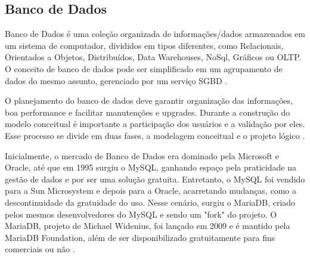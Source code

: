 \newpage

\newpage
\subsection{Banco de Dados}
Banco de Dados é uma coleção organizada de informações/dados armazenados em um sistema de computador, divididos em tipos diferentes, como Relacionais, Orientados a Objetos, Distribuídos, Data Warehouses, NoSql, Gráficos ou \gls{OLTP}. O conceito de banco de dados pode ser simplificado em um agrupamento de dados do mesmo assunto, gerenciado por um serviço \gls{SGBD} \cite{Andrade}.

O planejamento do banco de dados deve garantir organização das informações, boa performance e facilitar manutenções e upgrades. Durante a construção do modelo conceitual é importante a participação dos usuários e a validação por eles. Esse processo se divide em duas fases, a modelagem conceitual e o projeto lógico \cite{RicardoBD}.

Inicialmente, o mercado de Banco de Dados era dominado pela Microsoft e Oracle, até que em 1995 surgiu o MySQL, ganhando espaço pela praticidade na gestão de dados e por ser uma solução gratuita. Entretanto, o MySQL foi vendido para a Sun Microsystem e depois para a Oracle, acarretando mudanças, como a descontinuidade da gratuidade do uso. Nesse cenário, surgiu o MariaDB, criado pelos mesmos desenvolvedores do MySQL e sendo um "fork" do projeto. O MariaDB, projeto de Michael Widenius, foi lançado em 2009 e é mantido pela MariaDB Foundation, além de ser disponibilizado gratuitamente para fins comerciais ou não \cite{Rafael}.

